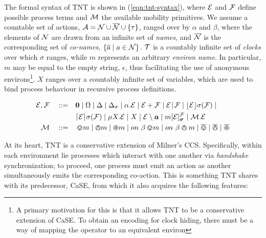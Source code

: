 \documentclass[orivec]{llncs}
\begin{document}
The formal syntax of TNT is shown in (\ref{eqn:tnt-syntax}), where
$\text{$\mathcal{E}$}$ and $\text{$\mathcal{F}$}$ define possible process terms and $\text{$\mathcal{M}$}$ the
available mobility primitives. We assume a countable set of actions,
$\text{$\mathcal{A}$} = \text{$\mathcal{N}$} \cup \text{$\overline{\text{$\mathcal{N}$}}$} \cup \{\tau\}$, ranged over by $\alpha$
and $\beta$, where the elements of $\text{$\mathcal{N}$}$ are drawn from an infinite
set of \emph{names}, and $\text{$\overline{\text{$\mathcal{N}$}}$}$ is the corresponding set of
\emph{co-names}, $\{\overline{a} \mid a \in \text{$\mathcal{N}$}\}$. $\text{$\mathcal{T}$}$ is a
countably infinite set of \emph{clocks} over which $\sigma$ ranges,
while $m$ represents an arbitrary \emph{environ name}. In particular,
$m$ may be equal to the empty string, $\epsilon$, thus facilitating the
use of anonymous environs\footnote{A primary motivation for this is that
it allows TNT to be a conservative extension of CaSE. To obtain an
encoding for clock hiding, there must be a way of mapping the operator
to an equivalent environ}. $X$ ranges over a countably infinite set of
variables, which are used to bind process behaviour in recursive process
definitions.

\begin{equation}
  \begin{aligned}
    \expr, \exprb \quad \mathrel{::=} \quad &
      \nil  \mid
      \Omega \mid
      \Delta \mid
      \Delta_{\sigma} \mid
      \alpha . \expr  \mid
      \expr + \exprb \mid
      \expr \mathrel{\!|\!} \exprb \mid
      \timeout{\expr}{\sigma}{\exprb} \mid \\
    & \stimeout{\expr}{\sigma}{\exprb} \mid 
      \mu X . \expr \mid
      X \mid 
      \expr \setminus \vec{a} \mid
      \locv{m}{\expr}{\exprb}{\vec{\sigma}} \mid
      \ambop . \expr \\
   \ambop \quad \mathrel{::=} \quad & \tntin{m} \mid \tntout{m} \mid \tntopen{m} \mid
      \procin{\beta}{m} \mid \procout{\beta}{m} \mid \bin \mid
      \bout \mid \bopen
   \end{aligned}
   \label{eqn:tnt-syntax}
\end{equation}


At its heart, TNT is a conservative extension of Milner's CCS.
Specifically, within each environment lie processes which interact with
one another via \emph{handshake} synchronization; to proceed, one
process must emit an action as another simultaneously emits the
corresponding co-action.  This is something TNT shares with its
predecessor, CaSE, from which it also acquires the following features:
\end{document}
